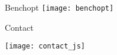 \documentclass[unknownkeysallowed]{beamer}
\begin{document}
\begin{frame}{Benchopt}
    \centering
    \texttt{[image: benchopt]}\\
\end{frame}


\begin{frame}{Contact}

\vspace{0.4cm}
\centering
\texttt{[image: contact\_js]}
\end{frame}



\end{document}
